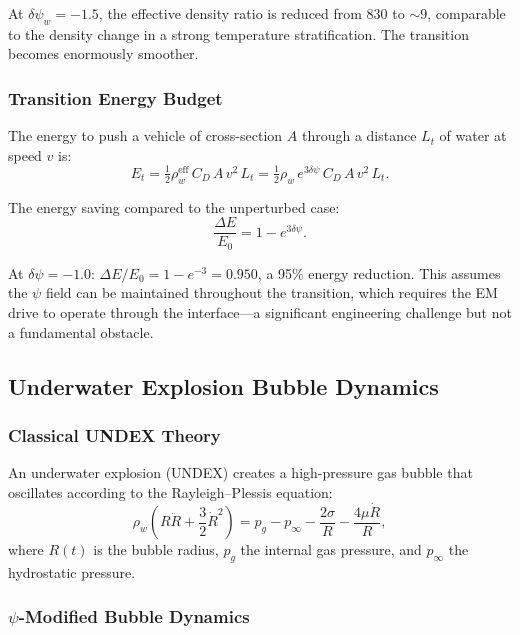 \documentclass[12pt,twocolumn]{article}
\newcommand{\Reff}{\mathrm{eff}}
\newcommand{\dpsi}{\delta\psi}
\newcommand{\half}{\tfrac{1}{2}}
\begin{document}
At $\dpsi_w = -1.5$, the effective density ratio is reduced from 830 to
$\sim 9$, comparable to the density change in a strong temperature
stratification. The transition becomes enormously smoother.

\subsubsection{Transition Energy Budget}

The energy to push a vehicle of cross-section $A$ through a distance
$L_t$ of water at speed $v$ is:
\begin{equation}
E_t = \half\rho_w^\Reff\,C_D\,A\,v^2\,L_t
= \half\rho_w\,e^{3\dpsi}\,C_D\,A\,v^2\,L_t.
\end{equation}

The energy saving compared to the unperturbed case:
\begin{equation}
\frac{\Delta E}{E_0} = 1 - e^{3\dpsi}.
\end{equation}

At $\dpsi = -1.0$: $\Delta E/E_0 = 1 - e^{-3} = 0.950$, a 95\% energy
reduction. This assumes the $\psi$ field can be maintained throughout
the transition, which requires the EM drive to operate through the
interface---a significant engineering challenge but not a fundamental
obstacle.

\subsection{Underwater Explosion Bubble Dynamics}
\label{sec:undex}

\subsubsection{Classical UNDEX Theory}

An underwater explosion (UNDEX) creates a high-pressure gas bubble that
oscillates according to the Rayleigh--Plessis equation:
\begin{equation}
\rho_w\!\left(R\ddot{R} + \frac{3}{2}\dot{R}^2\right)
= p_g - p_\infty - \frac{2\sigma}{R} - \frac{4\mu\dot{R}}{R},
\label{eq:rayleigh_plessis}
\end{equation}
where $R(t)$ is the bubble radius, $p_g$ the internal gas pressure, and
$p_\infty$ the hydrostatic pressure.

\subsubsection{$\psi$-Modified Bubble Dynamics}
\end{document}
